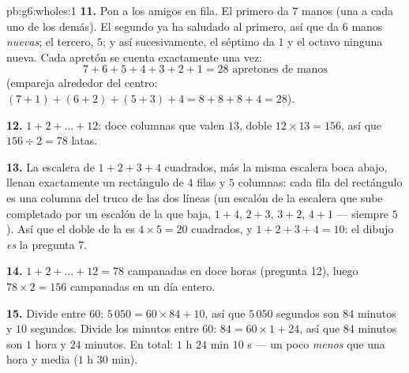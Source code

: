 \begin{solution}{pb:g6:wholes:1}
\textbf{11.} Pon a los amigos en fila. El primero da $7$ manos (una
a cada uno de los demás). El segundo ya ha saludado al
primero, así que da $6$ manos \emph{nuevas}; el tercero, $5$; y así
sucesivamente, el séptimo da $1$ y el octavo ninguna nueva.
Cada apretón se cuenta exactamente una vez:
\[
7 + 6 + 5 + 4 + 3 + 2 + 1 = 28 \text{ apretones de manos}
\]
(empareja alrededor del centro: $(7+1) + (6+2) + (5+3) + 4 =
8 + 8 + 8 + 4 = 28$).

\textbf{12.} $1 + 2 + \dots + 12$: doce columnas que valen $13$,
 doble $12 \times 13 = 156$, así que
$156 \div 2 = 78$ latas.

\textbf{13.} La escalera de $1 + 2 + 3 + 4$ cuadrados, más la
misma escalera boca abajo, llenan exactamente un rectángulo de $4$ filas y $5$
columnas: cada fila del rectángulo es una columna del
truco de las dos líneas (un escalón de la escalera que sube completado por un
escalón de la que baja, $1 + 4$, $2 + 3$, $3 + 2$, $4 + 1$ ---
siempre $5$). Así que el doble de la  es $4 \times 5 = 20$ cuadrados, y
$1 + 2 + 3 + 4 = 10$: el dibujo \emph{es} la pregunta 7.

\textbf{14.} $1 + 2 + \dots + 12 = 78$ campanadas en doce horas
(pregunta 12), luego $78 \times 2 = 156$ campanadas en un día entero.

\textbf{15.} Divide entre $60$: $5\,050 = 60 \times 84 + 10$, así que
$5\,050$ segundos son $84$ minutos y $10$ segundos. Divide los
minutos entre $60$: $84 = 60 \times 1 + 24$, así que $84$ minutos son
$1$ hora y $24$ minutos. En total: $1$ h $24$ min $10$ s --- un poco
\emph{menos} que una hora y media ($1$ h $30$ min).
\end{solution}
